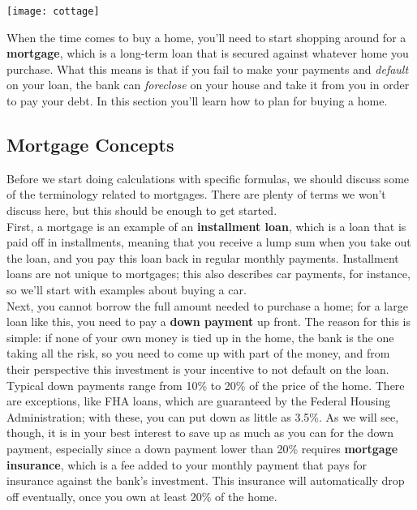 \setcounter{ExampleCounter}{1}
\begin{center}
\texttt{[image: cottage]}
\end{center}

When the time comes to buy a home, you'll need to start shopping around for a \textbf{mortgage}, which is a long-term loan that is secured against whatever home you purchase.  What this means is that if you fail to make your payments and \emph{default} on your loan, the bank can \emph{foreclose} on your house and take it from you in order to pay your debt.  In this section you'll learn how to plan for buying a home.

\subsection{Mortgage Concepts}
Before we start doing calculations with specific formulas, we should discuss some of the terminology related to mortgages.  There are plenty of terms we won't discuss here, but this should be enough to get started.\\

First, a mortgage is an example of an \textbf{installment loan}, which is a loan that is paid off in installments, meaning that you receive a lump sum when you take out the loan, and you pay this loan back in regular monthly payments.  Installment loans are not unique to mortgages; this also describes car payments, for instance, so we'll start with examples about buying a car.\\

Next, you cannot borrow the full amount needed to purchase a home; for a large loan like this, you need to pay a \textbf{down payment} up front.  The reason for this is simple: if none of your own money is tied up in the home, the bank is the one taking all the risk, so you need to come up with part of the money, and from their perspective this investment is your incentive to not default on the loan.  Typical down payments range from 10\% to 20\% of the price of the home.  There are exceptions, like FHA loans, which are guaranteed by the Federal Housing Administration; with these, you can put down as little as 3.5\%.  As we will see, though, it is in your best interest to save up as much as you can for the down payment, especially since a down payment lower than 20\% requires \textbf{mortgage insurance}, which is a fee added to your monthly payment that pays for insurance against the bank's investment.  This insurance will automatically drop off eventually, once you own at least 20\% of the home.\\

